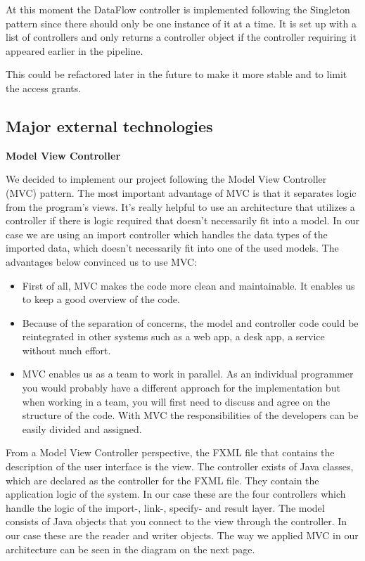 \documentclass[a4paper,english,fleqn]{exam}
\begin{document}
At this moment the DataFlow controller is implemented following the Singleton pattern since there should only be one instance of it at a time. It is set up with a list of controllers and only returns a controller object if the controller requiring it appeared earlier in the pipeline.
 
This could be refactored later in the future to make it more stable and to limit the access grants.



\newpage
\subsection{Major external technologies}


\textbf{Model View Controller} 

We decided to implement our project following the Model View Controller (MVC) pattern. The most important advantage of MVC is that it separates logic from the program's views. It's really helpful to use an architecture that utilizes a controller if there is logic required that doesn't necessarily fit into a model. In our case we are using an import controller which handles the data types of the imported data, which doesn't necessarily fit into one of the used models. The advantages below convinced us to use MVC:


\begin{itemize}
\item First of all, MVC makes the code more clean and maintainable. It enables us to keep a good overview of the code.


\item Because of the separation of concerns, the model and controller code could be reintegrated in other systems such as a web app, a desk app, a service without much effort.


\item MVC enables us as a team to work in parallel. As an individual programmer you would probably have a different approach for the implementation but when working in a team, you will first need to discuss and agree on the structure of the code. With MVC the responsibilities of the developers can be easily divided and assigned.

\end{itemize}

From a Model View Controller perspective, the FXML file that contains the description of the user interface is the view. The controller exists of Java classes, which are declared as the controller for the FXML file. They contain the application logic of the system. In our case these are the four controllers which handle the logic of the import-, link-, specify- and result layer. The model consists of Java objects that you connect to the view through the controller. In our case these are the reader and writer objects. The way we applied MVC in our architecture can be seen in the diagram on the next page.
\end{document}
